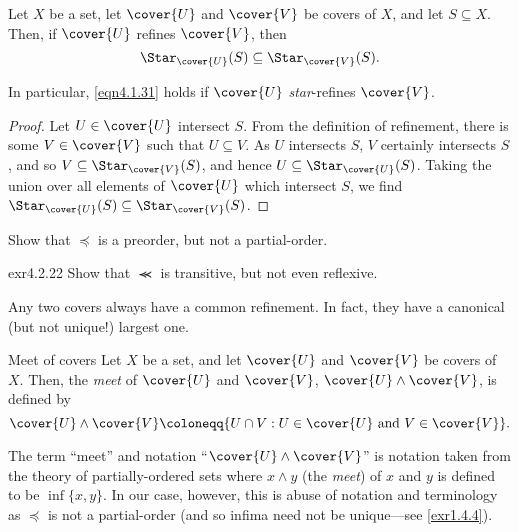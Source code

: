 \begin{prp}{}{}
Let $X$ be a set, let $\cover{U}$ and $\cover{V}$ be covers of $X$, and let $S\subseteq X$.  Then, if $\cover{U}$ refines $\cover{V}$, then
\begin{equation}\label{eqn4.1.31}
\Star _{\cover{U}}(S)\subseteq \Star _{\cover{V}}(S).
\end{equation}
\begin{rmk}
In particular, \eqref{eqn4.1.31} holds if $\cover{U}$ \emph{star}-refines $\cover{V}$.
\end{rmk}
\begin{proof}
Let $U\in \cover{U}$ intersect $S$.  From the definition of refinement, there is some $V\in \cover{V}$ such that $U\subseteq V$.  As $U$ intersects $S$, $V$ certainly intersects $S$, and so $V\subseteq \Star _{\cover{V}}(S)$, and hence $U\subseteq \Star _{\cover{U}}(S)$.  Taking the union over all elements of $\cover{U}$ which intersect $S$, we find $\Star _{\cover{U}}(S)\subseteq \Star _{\cover{V}}(S)$.
\end{proof}
\end{prp}
\begin{exr}{}{}
Show that $\preceq$ is a preorder, but not a partial-order.
\end{exr}
\begin{exr}{}{exr4.2.22}
Show that $\llcurly$ is transitive, but not even reflexive.
\end{exr}
Any two covers always have a common refinement.  In fact, they have a canonical (but not unique!) largest one.
\begin{dfn}{Meet of covers}{}
Let $X$ be a set, and let $\cover{U}$ and $\cover{V}$ be covers of $X$.  Then, the \emph{meet} of $\cover{U}$ and $\cover{V}$, $\cover{U}\wedge \cover{V}$, is defined by
\begin{equation}
\cover{U}\wedge \cover{V}\coloneqq \{ U\cap V:U\in \cover{U}\text{ and }V\in \cover{V}\} .
\end{equation}
\begin{rmk}
The term ``meet'' and notation ``$\cover{U}\wedge \cover{V}$'' is notation taken from the theory of partially-ordered sets where $x\wedge y$ (the \emph{meet}) of $x$ and $y$ is defined to be $\inf \{ x,y\}$.  In our case, however, this is abuse of notation and terminology as $\preceq$ is not a partial-order (and so infima need not be unique---see \cref{exr1.4.4}).
\end{rmk}
\end{dfn}
